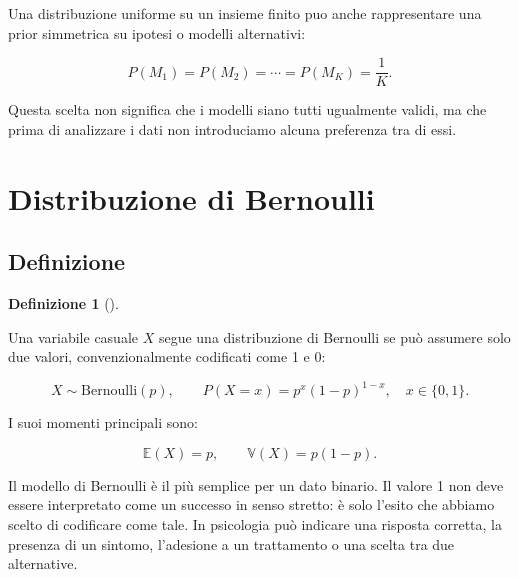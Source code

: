 \documentclass[
  italian,
  letterpaper,
  a4paper,
  11pt,
  open=any]{scrbook}
\theoremstyle{plain}
\theoremstyle{definition}
\theoremstyle{definition}
\newtheorem{definition}{Definizione}[chapter]
\theoremstyle{remark}
\begin{document}
\begin{tcolorbox}[enhanced jigsaw, arc=.35mm, bottomrule=.15mm, bottomtitle=1mm, breakable, colback=white, colbacktitle=quarto-callout-note-color!10!white, colframe=quarto-callout-note-color-frame, coltitle=black, left=2mm, leftrule=.75mm, opacityback=0, opacitybacktitle=0.6, rightrule=.15mm, title=\textcolor{quarto-callout-note-color}{\faInfo}\hspace{0.5em}{Interpretazione bayesiana}, titlerule=0mm, toprule=.15mm, toptitle=1mm]

Una distribuzione uniforme su un insieme finito puo anche rappresentare
una prior simmetrica su ipotesi o modelli alternativi:

\[
P(M_1)=P(M_2)=\cdots=P(M_K)=\frac{1}{K}.
\]

Questa scelta non significa che i modelli siano tutti ugualmente validi,
ma che prima di analizzare i dati non introduciamo alcuna preferenza tra
di essi.

\end{tcolorbox}

\section{Distribuzione di Bernoulli}\label{sec-bernoulli-distribution}

\subsection{Definizione}\label{definizione-1}

\begin{definition}[]\protect\hypertarget{def-bernoulli}{}\label{def-bernoulli}

Una variabile casuale \(X\) segue una distribuzione di Bernoulli se può
assumere solo due valori, convenzionalmente codificati come 1 e 0:

\[
X \sim \mathrm{Bernoulli}(p),
\qquad
P(X=x) = p^x(1-p)^{1-x},
\quad x \in \{0,1\}.
\]

I suoi momenti principali sono:

\[
\mathbb{E}(X) = p,
\qquad
\mathbb{V}(X) = p(1-p).
\]

\end{definition}

Il modello di Bernoulli è il più semplice per un dato binario. Il valore
1 non deve essere interpretato come un successo in senso stretto: è solo
l'esito che abbiamo scelto di codificare come tale. In psicologia può
indicare una risposta corretta, la presenza di un sintomo, l'adesione a
un trattamento o una scelta tra due alternative.
\end{document}
